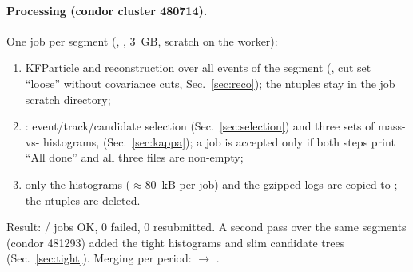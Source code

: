 \paragraph{Processing (condor cluster 480714).} One job per segment (,
, 3~GB, scratch on the worker):
\begin{enumerate}
\item KFParticle \Ks{} and \La{} reconstruction over all events of the segment (, cut set
  ``loose'' without covariance cuts, Sec.~\ref{sec:reco}); the ntuples stay in the job scratch directory;
\item {}: event/track/candidate selection (Sec.~\ref{sec:selection}) and three sets of mass-vs-\pt{}
  histograms,  (Sec.~\ref{sec:kappa}); a job is accepted only if both steps print
  ``All done'' and all three files are non-empty;
\item only the histograms ($\approx$80~kB per job) and the gzipped logs are copied to
  ; the ntuples are deleted.
\end{enumerate}
Result: \JobsOk/\JobsN{} jobs OK, 0 failed, 0 resubmitted. A second pass over the same segments (condor 481293) added the tight \La{} histograms and slim candidate trees (Sec.~\ref{sec:tight}). Merging per period: 
$\to$ .

